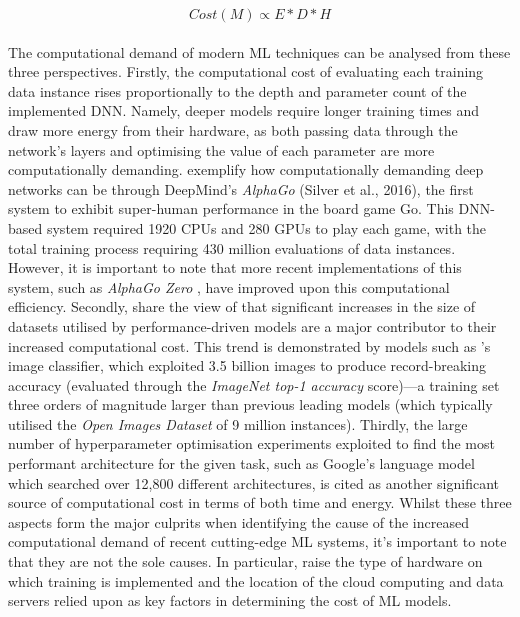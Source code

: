 \documentclass[a4paper, 12pt]{article}
\begin{document}
    \begin{equation}
        Cost(M) \propto E * D * H
        \label{eq:cost}
    \end{equation}
    \\
    The computational demand of modern ML techniques can be analysed from these three perspectives. Firstly, the computational cost of evaluating each training data instance rises proportionally to the depth and parameter count of the implemented DNN. Namely, deeper models require longer training times and draw more energy from their hardware, as both passing data through the network's layers and optimising the value of each parameter are more computationally demanding.  exemplify how computationally demanding deep networks can be through DeepMind's \emph{AlphaGo} (Silver et al., 2016), the first system to exhibit super-human performance in the board game Go. This DNN-based system required 1920 CPUs and 280 GPUs to play each game, with the total training process requiring 430 million evaluations of data instances. However, it is important to note that more recent implementations of this system, such as \emph{AlphaGo Zero} \cite{silver-2017}, have improved upon this computational efficiency. Secondly,  share the view of  that significant increases in the size of datasets utilised by performance-driven models are a major contributor to their increased computational cost. This trend is demonstrated by models such as 's image classifier, which exploited 3.5 billion images to produce record-breaking accuracy (evaluated through the \emph{ImageNet top-1 accuracy} score)---a training set three orders of magnitude larger than previous leading models (which typically utilised the \emph{Open Images Dataset} of 9 million instances). Thirdly, the large number of hyperparameter optimisation experiments exploited to find the most performant architecture for the given task, such as Google's language model \cite{cer-2018} which searched over 12,800 different architectures, is cited as another significant source of computational cost in terms of both time and energy. Whilst these three aspects form the major culprits when identifying the cause of the increased computational demand of recent cutting-edge ML systems, it's important to note that they are not the sole causes. In particular,  raise the type of hardware on which training is implemented and the location of the cloud computing and data servers relied upon as key factors in determining the cost of ML models.
\end{document}
